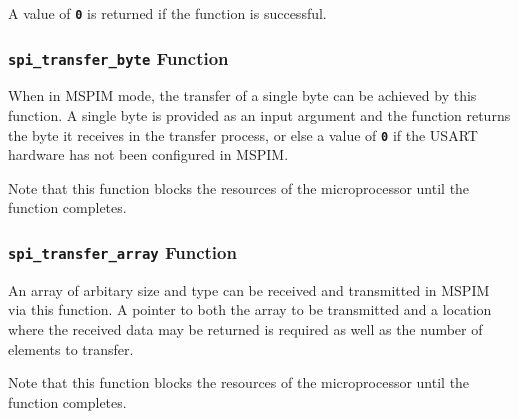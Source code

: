 \documentclass[a4paper, oneside, 11pt, titlepage, onecolumn, openright]{report}
\begin{document}
A value of \textbf{\texttt{0}} is returned if the function is successful.
			
					\subsubsection{\textbf{\texttt{spi\_transfer\_byte}} Function}
						\label{sss:Hardware Abstraction Libraries:usart Module:Master SPI Mode Functions:spi_transfer_byte Function}
			
						When in MSPIM mode, the transfer of a single byte can be achieved by this function. A single byte is provided as an input argument and the function returns the byte it receives in the transfer process, or else a value of \textbf{\texttt{0}} if the USART hardware has not been configured in MSPIM.
	
Note that this function blocks the resources of the microprocessor until the function completes.
			
					\subsubsection{\textbf{\texttt{spi\_transfer\_array}} Function}
						\label{sss:Hardware Abstraction Libraries:usart Module:Master SPI Mode Functions:spi_transfer_array Function}
			
						An array of arbitary size and type can be received and transmitted in MSPIM via this function. A pointer to both the array to be transmitted and a location where the received data may be returned is required as well as the number of elements to transfer.
			
Note that this function blocks the resources of the microprocessor until the function completes.


	\appendix
\end{document}
